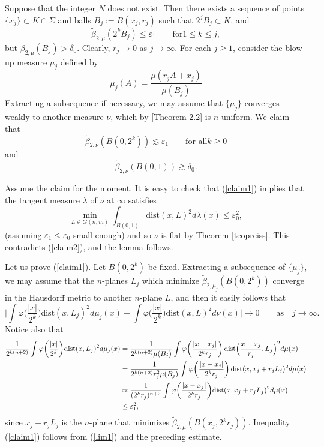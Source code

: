 \documentclass[12pt,leqno]{article}
\newcommand{\vphi}{{\varphi}}
\newcommand{\rf}[1]{{(\ref{#1})}}
\newcommand{\wt}[1]{{\widetilde{#1}}}
\newcommand{\ve}{{\varepsilon}}
\newcommand{\dist}{\mathrm{dist}}
\theoremstyle{plain}
\newenvironment{proof}{\medskip\noindent{\bf Proof: }\rmfamily}{\medskip}
\numberwithin{equation}{section}
\begin{document}
\begin{proof}
Suppose that the integer $N$ does not exist. Then there exists a
sequence of points $\{x_j\}\subset K\cap\Sigma$ and balls $B_j:=
B(x_j,r_j)$ such that $2^jB_j\subset K$, and
$$\wt\beta_{2,\mu}(2^kB_j)\leq \ve_1\qquad \mbox{for
$1\leq k\leq j$},$$ but $\wt\beta_{2,\mu}(B_j)>\delta_0$. Clearly,
$r_j\to0$ as $j\to\infty$. For each $j\geq1$, consider the blow
up measure $\mu_j$ defined by
$$
\mu_j(A) = \frac{\mu(r_jA + x_j)}{\mu(B_j)}
$$
Extracting a subsequence if necessary, we may assume that
$\{\mu_j\}$ converges weakly to another measure $\nu$, which by
\cite{KT} [Theorem 2.2] is $n$-uniform. We claim that
\begin{equation}\label{claim1}
\wt\beta_{2,\nu}(B(0,2^k))\lesssim \ve_1 \qquad\mbox{for all
$k\geq0$}
\end{equation}
and
\begin{equation}\label{claim2}
\wt\beta_{2,\nu}(B(0,1))\gtrsim \delta_0.
\end{equation}

Assume the claim for the moment. It is easy to check that \rf{claim1}
implies that the tangent measure $\lambda$ of $\nu$ at $\infty$
satisfies
$$\min_{L\in G(n,m)} \int_{B(0,1)}\dist(x,L)^2d\lambda(x)  \leq \ve_0^2,$$
(assuming $\ve_1\leq\ve_0$ small enough) and so $\nu$ is flat by
Theorem \ref{teopreiss}. This contradicts \rf{claim2}, and the lemma
follows.

Let us prove \rf{claim1}. Let $B(0,2^k)$ be fixed. Extracting a
subsequence of $\{\mu_j\}$, we may assume that the $n$-planes $L_j$
which minimize $\wt\beta_{2,\mu_j}(B(0,2^k))$ converge in the
Hausdorff metric to another $n$-plane $L$, and then it easily
follows that
\begin{equation}\label{lim1}
\biggl| \int \vphi\biggl(\frac{|x|}{2^k}\biggr)
\dist(x,L_j)^2d\mu_j(x) - \int \vphi\biggl(\frac{|x|}{2^k}\biggr)
\dist(x,L)^2d\nu(x)\biggr| \to 0\qquad \mbox{as}\quad j\to\infty.
\end{equation}
Notice also that
\begin{align}
\frac1{2^{k(n+2)}} \int \vphi\biggl(\frac{|x|}{2^k}\biggr)
\dist(x,L_j)^2d\mu_j(x) & = \frac1{2^{k(n+2)}\mu(B_j)}\int
\vphi\biggl(\frac{|x-x_j|}{2^kr_j}\biggr)\,
\dist\Bigl(\frac{x-x_j}{r_j},L_j\Bigr)^2d\mu(x)\nonumber \\
& = \frac1{2^{k(n+2)}r_j^2\mu(B_j)}\int
\vphi\biggl(\frac{|x-x_j|}{2^kr_j}\biggr)\,
\dist(x,x_j+r_jL_j)^2d\mu(x) \nonumber\\
& \approx \frac1{(2^{k}r_j)^{n+2}}\int
\vphi\biggl(\frac{|x-x_j|}{2^kr_j}\biggr)
\dist(x,x_j+r_jL_j)^2d\mu(x) \nonumber\\
& \leq \ve_1^2,
\end{align}
since $x_j+r_jL_j$ is the $n$-plane that minimizes
$\wt\beta_{2,\mu}(B(x_j,2^kr_j))$. Inequality \rf{claim1} follows
from \rf{lim1} and the preceding estimate.


\end{proof}
\end{document}
